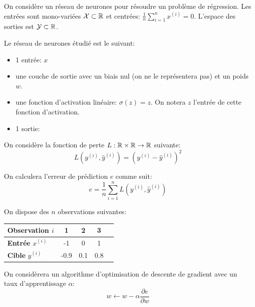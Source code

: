 \documentclass[]{../exercices}
\begin{document}
	
	
	\begin{exercice}
		On considère un réseau de neurones pour résoudre un problème de régression. Les entrées sont mono-variées $\mathcal{X} \subset \mathbb{R}$ et centrées: $\frac{1}{n} \sum_{i=1}^n x^{(i)} = 0$. L'espace des sorties est $\mathcal{Y} \subset \mathbb{R}$.
		
		Le réseau de neurones étudié est le suivant:
		\begin{itemize}
			\item 1 entrée: $x$
			\item une couche de sortie avec un biais nul (on ne le représentera pas) et un poids $w$.
			\item une fonction d'activation linéaire: $\sigma(z) = z$. On notera $z$ l'entrée de cette fonction d'activation.
			\item 1 sortie: 
		\end{itemize}
		
		On considère la fonction de perte $L: \mathbb{R} \times \mathbb{R} \to \mathbb{R}$ suivante:
		\begin{equation*}
			L(y^{(i)}, \hat{y}^{(i)}) = \left(y^{(i)} - \hat{y}^{(i)}\right)^2
		\end{equation*}
		
		On calculera l'erreur de prédiction $e$ comme suit:
		\begin{equation*}
			e = \frac{1}{n} \sum_{i=1}^n L(y^{(i)}, \hat{y}^{(i)})
		\end{equation*}
		
		
		On dispose des $n$ observations suivantes:
		\begin{table}[h]
			\centering
			\begin{tabular}{|l|c|c|c|c|}
				\hline
				\textbf{Observation} $i$ & 1 & 2 & 3 \\
				\hline
				\textbf{Entrée} $x^{(i)}$ & -1 & 0 & 1 \\
				\hline
				\textbf{Cible}  $y^{(i)}$ & -0.9 & 0.1 & 0.8 \\
				\hline
			\end{tabular}
		\end{table}
		
		On considèrera un algorithme d'optimisation de descente de gradient avec un taux d'apprentissage $\alpha$:
		\begin{equation*}
			w \leftarrow w - \alpha \frac{\partial{e}}{\partial{w}}
		\end{equation*}
		

\end{exercice}
\end{document}
